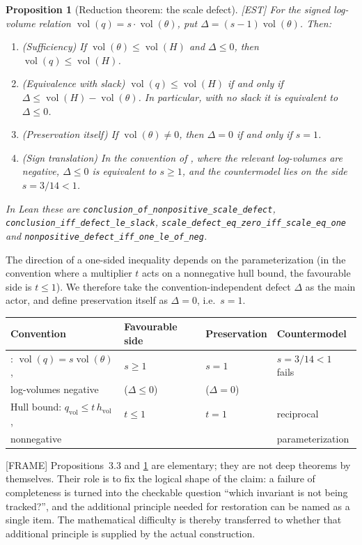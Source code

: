 \documentclass[11pt]{article}
\theoremstyle{plain}
\newtheorem{proposition}[theorem]{Proposition}
\theoremstyle{definition}
\theoremstyle{remark}
\newcommand{\FRAME}{\textup{[FRAME]}}
\newcommand{\EST}{\textup{[EST]}}
\newcommand{\vol}{\operatorname{vol}}
\begin{document}
\begin{proposition}[Reduction theorem: the scale defect]\label{prop:defect}\EST{}
For the signed log-volume relation $\vol(q)=s\cdot\vol(\theta)$, put
$\Delta=(s-1)\vol(\theta)$.  Then:
\begin{enumerate}[label=\textup{(\roman*)}]
\item (Sufficiency) If $\vol(\theta)\le\vol(H)$ and $\Delta\le0$,
then $\vol(q)\le\vol(H)$.
\item (Equivalence with slack) $\vol(q)\le\vol(H)$ if and only if
$\Delta\le\vol(H)-\vol(\theta)$.  In particular, with no slack it is
equivalent to $\Delta\le0$.
\item (Preservation itself) If $\vol(\theta)\ne0$, then $\Delta=0$
if and only if $s=1$.
\item (Sign translation) In the convention of \cite{U26}, where the
relevant log-volumes are negative, $\Delta\le0$ is equivalent to
$s\ge1$, and the countermodel lies on the side $s=3/14<1$.
\end{enumerate}
In Lean these are
\texttt{conclusion\_of\_nonpositive\_scale\_defect},
\texttt{conclusion\_iff\_defect\_le\_slack},
\texttt{scale\_defect\_eq\_zero\_iff\_scale\_eq\_one} and
\texttt{nonpositive\_defect\_iff\_one\_le\_of\_neg}.
\end{proposition}

The direction of a one-sided inequality depends on the
parameterization (in the convention where a multiplier $t$ acts on a
nonnegative hull bound, the favourable side is $t\le1$).  We
therefore take the convention-independent defect $\Delta$ as the
main actor, and define preservation itself as $\Delta=0$, i.e.\ $s=1$.

\begin{center}
\begin{tabular}{llll}
\toprule
Convention & Favourable side & Preservation & Countermodel\\
\midrule
\cite{U26}: $\vol(q)=s\vol(\theta)$, & $s\ge1$ & $s=1$ &
$s=3/14<1$ fails\\
\quad log-volumes negative & ($\Delta\le0$) & ($\Delta=0$) &\\
Hull bound: $q_{\mathrm{vol}}\le t\,h_{\mathrm{vol}}$, & $t\le1$ &
$t=1$ & reciprocal\\ \quad nonnegative & &
& parameterization\\
\bottomrule
\end{tabular}
\end{center}

\FRAME{} Propositions~3.3 and \ref{prop:defect} are elementary; they
are not deep theorems by themselves.  Their role is to fix the
logical shape of the claim: a failure of completeness is turned into
the checkable question ``which invariant is not being tracked?'',
and the additional principle needed for restoration can be named as
a single item.  The mathematical difficulty is thereby transferred
to whether that additional principle is supplied by the actual
construction.
\end{document}
